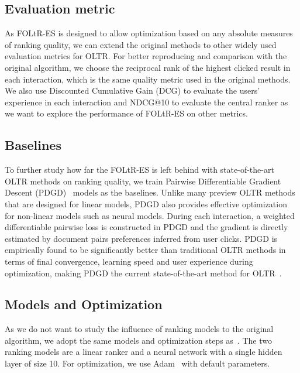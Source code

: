 \subsection{Evaluation metric}
As FOLtR-ES is designed to allow optimization based on any absolute measures of ranking quality, we can extend the original methods to other widely used evaluation metrics for OLTR. For better reproducing and comparison with the original algorithm, we choose the reciprocal rank of the highest clicked result in each interaction, which is the same quality metric used in the original methods. We also use Discounted Cumulative Gain (DCG) to evaluate the users' experience in each interaction and NDCG@10 to evaluate the central ranker as we want to explore the performance of FOLtR-ES on other metrics.

\subsection{Baselines}

To further study how far the FOLtR-ES is left behind with state-of-the-art OLTR methods on ranking quality, we train Pairwise Differentiable Gradient Descent (PDGD)~\cite{oosterhuis2018differentiable} models as the baselines. Unlike many preview OLTR methods that are designed for linear models, PDGD also provides effective optimization for non-linear models such as neural models. During each interaction, a weighted differentiable pairwise loss is constructed in PDGD and the gradient is directly estimated by document pairs preferences inferred from user clicks. PDGD is empirically found to be significantly better than traditional OLTR methods in terms of final convergence, learning speed and user experience during optimization, making PDGD the current state-of-the-art method for OLTR~\cite{jagerman2019model,zhuang2020counterfactual}.
 
\subsection{Models and Optimization}
As we do not want to study the influence of ranking models to the original algorithm, we adopt the same models and optimization steps as~\cite{kharitonov2019federated}. The two ranking models are a linear ranker and a neural network with a single hidden layer of size 10. For optimization, we use Adam~\cite{kingma2014adam} with default parameters.

